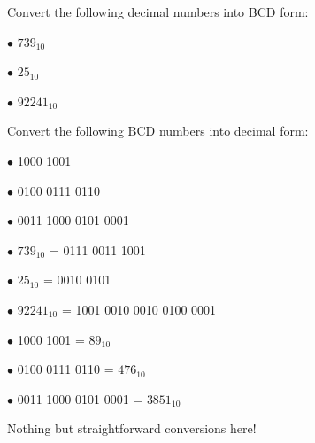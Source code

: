 

Convert the following decimal numbers into BCD form:

\medskip
\item{$\bullet$} $739_{10}$
\item{$\bullet$} $25_{10}$
\item{$\bullet$} $92241_{10}$
\medskip

\vskip 10pt

Convert the following BCD numbers into decimal form:

\medskip
\item{$\bullet$} 1000 1001
\item{$\bullet$} 0100 0111 0110
\item{$\bullet$} 0011 1000 0101 0001
\medskip








\medskip
\item{$\bullet$} $739_{10}$ = 0111 0011 1001
\item{$\bullet$} $25_{10}$ = 0010 0101
\item{$\bullet$} $92241_{10}$ = 1001 0010 0010 0100 0001
\medskip

\medskip
\item{$\bullet$} 1000 1001 = $89_{10}$
\item{$\bullet$} 0100 0111 0110 = $476_{10}$
\item{$\bullet$} 0011 1000 0101 0001 = $3851_{10}$
\medskip







Nothing but straightforward conversions here!




